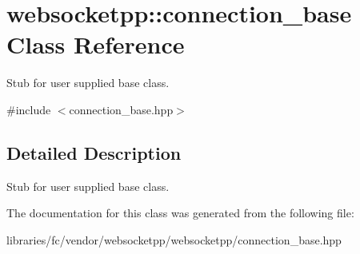 \hypertarget{classwebsocketpp_1_1connection__base}{}\section{websocketpp\+:\+:connection\+\_\+base Class Reference}
\label{classwebsocketpp_1_1connection__base}


Stub for user supplied base class.  




{\ttfamily \#include $<$connection\+\_\+base.\+hpp$>$}



\subsection{Detailed Description}
Stub for user supplied base class. 

The documentation for this class was generated from the following file\+:\begin{DoxyCompactItemize}
\item 
libraries/fc/vendor/websocketpp/websocketpp/connection\+\_\+base.\+hpp\end{DoxyCompactItemize}
